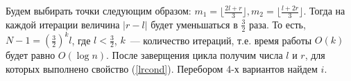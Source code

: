 \documentclass{article}
\begin{document}
\begin{enumerate}
Будем выбирать точки следующим образом: $m_1=\lfloor\frac{2l+r}{3}\rfloor,m_2=\lfloor\frac{l+2r}{3}\rfloor$. Тогда на каждой итерации величина $|r-l|$ будет уменьшаться в $\frac{3}{2}$ раза. То есть, $N-1=(\frac{3}{2})^k l$, где $l<\frac{3}{2}$, $k$~--- количество итераций, т.е. время работы $O(k)$ будет равно $O(\log n)$.\newline
После заверщения цикла получим числа $l$ и $r$, для которых выполнено свойство (\ref{lrcond}). Перебором 4-х вариантов найдем $i$.
\end{enumerate}
\end{document}
